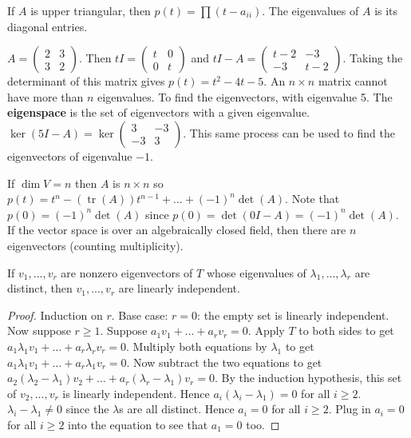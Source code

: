 \documentclass{article}
\newcommand{\vocab}[1]{\textbf{\color{blue!90}\boldmath #1}}
\DeclareMathOperator{\tr}{tr}
\begin{document}
\begin{example}
If $A$ is upper triangular, then $p(t)=\prod (t-a_{ii})$. The eigenvalues of $A$ is its diagonal entries.
\end{example}
\begin{example}
$A=\begin{pmatrix}
2&3\\
3&2
\end{pmatrix}$. Then $tI=\begin{pmatrix}
t&0\\
0&t
\end{pmatrix}$ and $tI-A=\begin{pmatrix}
t-2&-3\\
-3&t-2
\end{pmatrix}$. Taking the determinant of this matrix gives $p(t)=t^2-4t-5$. An $n\times n$ matrix cannot have more than $n$ eigenvalues. To find the eigenvectors, with eigenvalue 5. The \vocab{eigenspace} is the set of eigenvectors with a given eigenvalue. $\ker(5I-A)=\ker\begin{pmatrix}
3&-3\\
-3&3
\end{pmatrix}$. This same process can be used to find the eigenvectors of eigenvalue $-1$.
\end{example}
If $\dim V=n$ then $A$ is $n\times n$ so $p(t)=t^n-(\tr(A))t^{n-1}+...+(-1)^n\det(A)$. Note that $p(0)=(-1)^n\det(A)$ since $p(0)=\det(0I-A)=(-1)^n\det(A)$. If the vector space is over an algebraically closed field, then there are $n$ eigenvectors (counting multiplicity).
\begin{proposition}
If $v_1,...,v_r$ are nonzero eigenvectors of $T$ whose eigenvalues of $\lambda_1,...,\lambda_r$ are distinct, then $v_1,...,v_r$ are linearly independent.
\end{proposition}
\begin{proof}
Induction on $r$. Base case: $r=0$: the empty set is linearly independent. Now suppose $r\geq 1$. Suppose $a_1v_1+...+a_rv_r=0$. Apply $T$ to both sides to get $a_1\lambda_1v_1+...+a_r\lambda_rv_r=0$. Multiply both equations by $\lambda_1$ to get $a_1\lambda_1v_1+...+a_r\lambda_1v_r=0$. Now subtract the two equations to get $a_2(\lambda_2-\lambda_1)v_2+...+a_r(\lambda_r-\lambda_1)v_r=0$. By the induction hypothesis, this set of $v_2,...,v_r$ is linearly independent. Hence $a_i(\lambda_i-\lambda_1)=0$ for all $i\geq 2$. $\lambda_i-\lambda_1\neq0$ since the $\lambda$s are all distinct. Hence $a_i=0$ for all $i\geq 2$. Plug in $a_i=0$ for all $i\geq 2$ into the equation to see that $a_1=0$ too. 
\end{proof}
\end{document}
